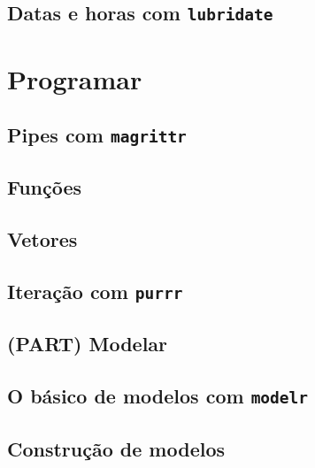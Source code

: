 \documentclass[
]{book}
\theoremstyle{definition}
\theoremstyle{definition}
\theoremstyle{definition}
\theoremstyle{definition}
\theoremstyle{remark}
\begin{document}
\hypertarget{datas-e-horas-com-lubridate}{%
\chapter{\texorpdfstring{Datas e horas com \texttt{lubridate}}{Datas e horas com lubridate}}\label{datas-e-horas-com-lubridate}}

\hypertarget{part-programar}{%
\part{Programar}\label{part-programar}}

\hypertarget{pipes-com-magrittr}{%
\chapter{\texorpdfstring{Pipes com \texttt{magrittr}}{Pipes com magrittr}}\label{pipes-com-magrittr}}

\hypertarget{funuxe7uxf5es}{%
\chapter{Funções}\label{funuxe7uxf5es}}

\hypertarget{vetores}{%
\chapter{Vetores}\label{vetores}}

\hypertarget{iterauxe7uxe3o-com-purrr}{%
\chapter{\texorpdfstring{Iteração com \texttt{purrr}}{Iteração com purrr}}\label{iterauxe7uxe3o-com-purrr}}

\hypertarget{part-modelar}{%
\chapter{(PART) Modelar}\label{part-modelar}}

\hypertarget{o-buxe1sico-de-modelos-com-modelr}{%
\chapter{\texorpdfstring{O básico de modelos com \texttt{modelr}}{O básico de modelos com modelr}}\label{o-buxe1sico-de-modelos-com-modelr}}

\hypertarget{construuxe7uxe3o-de-modelos}{%
\chapter{Construção de modelos}\label{construuxe7uxe3o-de-modelos}}
\end{document}
